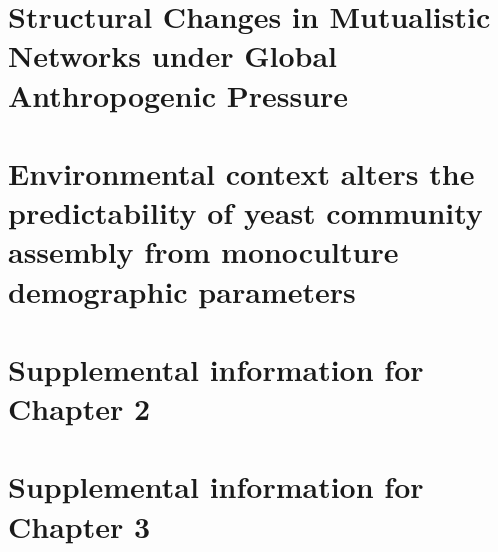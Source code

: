 \documentclass{uscthesis}
\begin{document}
                                                                  


\chapter[Structural Changes in Mutualistic Networks under Global Anthropogenic Pressure]{Structural Changes in Mutualistic Networks under Global Anthropogenic Pressure}   

                                                                  

\chapter[Environmental context alters the predictability of yeast community assembly from monoculture demographic parameters]{Environmental context alters the predictability of yeast community assembly from monoculture demographic parameters}   

                                                                  

\printbibliography[heading=bibintoc, title={References}]



\Appendices                 %


\chapter{Supplemental information for Chapter 2}


\chapter{Supplemental information for Chapter 3}


\end{document}
